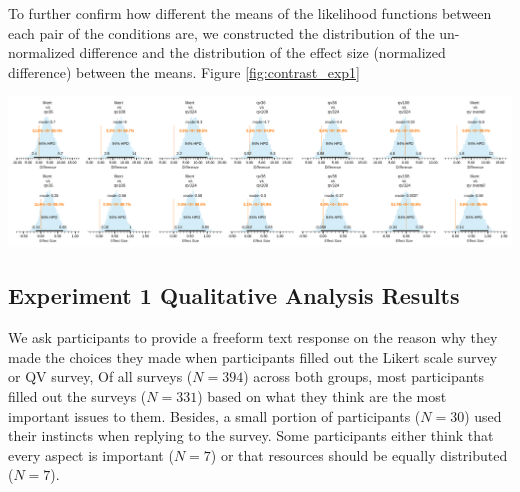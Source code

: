To further confirm how different the means of the likelihood functions between each pair of the conditions are, we constructed the distribution of the un-normalized difference and the distribution of the effect size (normalized difference) between the means. Figure \ref{fig:contrast_exp1}


\begin{landscape}[hbt]
    \centering
    \includegraphics[width=1.4\textwidth, keepaspectratio=true]{content/image/Votes_vs_Absolute_Donation_StudentT_differences_and_effects.pdf}
    \label{fig:contrast_exp1}
\end{landscape}
    
\subsection{Experiment 1 Qualitative Analysis Results}\label{results-1-qual}
We ask participants to provide a freeform text response on the reason why they made the choices they made
when participants filled out the Likert scale survey or QV survey,
Of all surveys ($N=394$) across both groups, most participants filled out the surveys ($N=331$) based on what they think are the most important issues to them. %
Besides, a small portion of participants ($N=30$) used their instincts when replying to the survey.
Some participants either think that every aspect is important ($N=7$) or that resources should be equally distributed ($N=7$).


